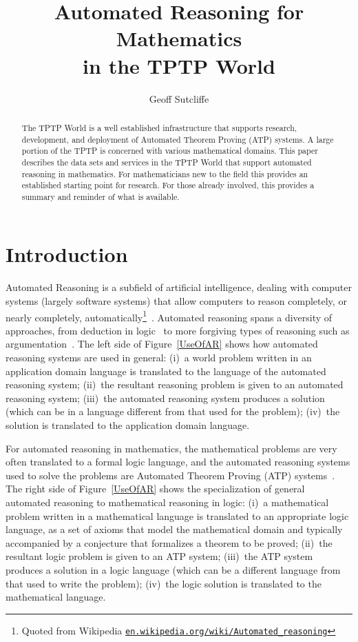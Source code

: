 \documentclass[runningheads]{llncs}
\title{Automated Reasoning for Mathematics \\ in the TPTP World}
\author{
  Geoff Sutcliffe\orcidID{0000-0001-9120-3927}\Envelope
}
\institute{
  University of Miami,
  Miami, USA\\
  \email{geoff@cs.miami.edu}\\
}
\begin{document}
\maketitle

\begin{abstract}
The TPTP World is a well established infrastructure that supports research, development, and 
deployment of Automated Theorem Proving (ATP) systems.
A large portion of the TPTP is concerned with various mathematical domains.
This paper describes the data sets and services in the TPTP World that support automated reasoning
in mathematics.
For mathematicians new to the field this provides an established starting point for research.
For those already involved, this provides a summary and reminder of what is available.
\end{abstract}
\section{Introduction}
\label{Introduction}

Automated Reasoning is a subfield of artificial intelligence, dealing with computer systems
(largely software systems) that allow computers to reason completely, or nearly completely, 
automatically\footnote{%
Quoted from Wikipedia \href{https://en.wikipedia.org/wiki/Automated_reasoning}{{\tt en.wikipedia.org/wiki/Automated\_reasoning}}}~\cite{RV01-HAR}.
Automated reasoning spans a diversity of approaches, from deduction in logic~\cite{Gal15} to more 
forgiving types of reasoning such as argumentation~\cite{vE+14}.
The left side of Figure~\ref{UseOfAR} shows how automated reasoning systems are used in general: 
(i)~a world problem written in an application domain language is translated to the language
of the automated reasoning system; (ii)~the resultant reasoning problem is given to an automated 
reasoning system; (iii)~the automated reasoning system produces a solution (which can be in a
language different from that used for the problem); (iv)~the solution is translated to the 
application domain language.

For automated reasoning in mathematics, the mathematical problems are very often translated to 
a formal logic language, and the automated reasoning systems used to solve the problems are 
Automated Theorem Proving (ATP) systems~\cite{Bun83,RV01-HAR}.
The right side of Figure~\ref{UseOfAR} shows the specialization of general automated reasoning
to mathematical reasoning in logic:
(i)~a mathematical problem written in a mathematical language is translated to an appropriate 
logic language, as a set of axioms that model the mathematical domain and typically accompanied 
by a conjecture that formalizes a theorem to be proved; (ii)~the resultant logic problem is given 
to an ATP system; (iii)~the ATP system produces a solution in a logic language (which can be 
a different language from that used to write the problem); (iv)~the logic solution is translated 
to the mathematical language.
\end{document}
